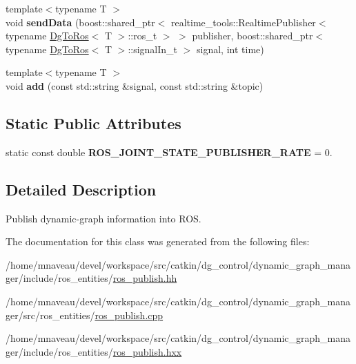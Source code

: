 \begin{DoxyCompactItemize}
\item 
{\footnotesize template$<$typename T $>$ }\\void {\bfseries send\+Data} (boost\+::shared\+\_\+ptr$<$ realtime\+\_\+tools\+::\+Realtime\+Publisher$<$ typename \hyperlink{classdynamic__graph_1_1DgToRos}{Dg\+To\+Ros}$<$ T $>$\+::ros\+\_\+t $>$ $>$ publisher, boost\+::shared\+\_\+ptr$<$ typename \hyperlink{classdynamic__graph_1_1DgToRos}{Dg\+To\+Ros}$<$ T $>$\+::signal\+In\+\_\+t $>$ signal, int time)\hypertarget{classdynamic__graph_1_1RosPublish_a3d0602010171406c481116458ced5211}{}\label{classdynamic__graph_1_1RosPublish_a3d0602010171406c481116458ced5211}

\item 
{\footnotesize template$<$typename T $>$ }\\void {\bfseries add} (const std\+::string \&signal, const std\+::string \&topic)\hypertarget{classdynamic__graph_1_1RosPublish_af77a721d482487d5cf55929ccbbeef96}{}\label{classdynamic__graph_1_1RosPublish_af77a721d482487d5cf55929ccbbeef96}

\end{DoxyCompactItemize}
\subsection*{Static Public Attributes}
\begin{DoxyCompactItemize}
\item 
static const double {\bfseries R\+O\+S\+\_\+\+J\+O\+I\+N\+T\+\_\+\+S\+T\+A\+T\+E\+\_\+\+P\+U\+B\+L\+I\+S\+H\+E\+R\+\_\+\+R\+A\+TE} = 0.\hypertarget{classdynamic__graph_1_1RosPublish_af3ffea00d60088a4b921a8a37b0f405d}{}\label{classdynamic__graph_1_1RosPublish_af3ffea00d60088a4b921a8a37b0f405d}

\end{DoxyCompactItemize}


\subsection{Detailed Description}
Publish dynamic-\/graph information into R\+OS. 

The documentation for this class was generated from the following files\+:\begin{DoxyCompactItemize}
\item 
/home/mnaveau/devel/workspace/src/catkin/dg\+\_\+control/dynamic\+\_\+graph\+\_\+manager/include/ros\+\_\+entities/\hyperlink{ros__publish_8hh}{ros\+\_\+publish.\+hh}\item 
/home/mnaveau/devel/workspace/src/catkin/dg\+\_\+control/dynamic\+\_\+graph\+\_\+manager/src/ros\+\_\+entities/\hyperlink{ros__publish_8cpp}{ros\+\_\+publish.\+cpp}\item 
/home/mnaveau/devel/workspace/src/catkin/dg\+\_\+control/dynamic\+\_\+graph\+\_\+manager/include/ros\+\_\+entities/\hyperlink{ros__publish_8hxx}{ros\+\_\+publish.\+hxx}\end{DoxyCompactItemize}
